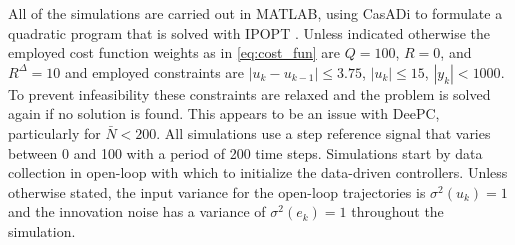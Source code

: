 All of the simulations are carried out in MATLAB, using CasADi \citep{Andersson2019} to formulate a quadratic program that is solved with IPOPT \citep{Wachter2006}. Unless indicated otherwise the employed cost function weights as in \eqref{eq:cost_fun} are $Q=100$, $R=0$, and $R^\Delta=10$ and employed constraints are $|u_k-u_{k-1}|\leq3.75$, $|u_k|\leq15$, $|y_k|<1000$. To prevent infeasibility these constraints are relaxed and the problem is solved again if no solution is found. This appears to be an issue with \ac{DeePC}, particularly for $\bar{N}<200$. All simulations use a step reference signal that varies between 0 and 100 with a period of 200 time steps. Simulations start by data collection in open-loop with which to initialize the data-driven controllers. Unless otherwise stated, the input variance for the open-loop trajectories is $\sigma^2(u_k)=1$ and the innovation noise has a variance of $\sigma^2(e_k)=1$ throughout the simulation.